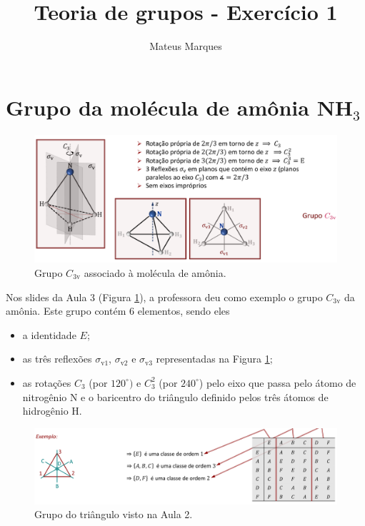 \documentclass[a4paper,10pt]{article}
\title{\Huge{\textbf{Teoria de grupos - Exercício 1}}}
\author{Mateus Marques}
\begin{document}
\maketitle

\section*{Grupo da molécula de amônia NH$_3$}

\begin{figure}[H]
\centering
\includegraphics[width=\linewidth]{fig/C3v.png}
\caption{Grupo $C_{3\text{v}}$ associado à molécula de amônia.}
\label{fig:C3v}
\end{figure}

Nos slides da Aula 3 (Figura \ref{fig:C3v}), a professora deu como exemplo o grupo $C_{3\text{v}}$ da amônia. Este grupo contém 6 elementos, sendo eles
\begin{itemize}
\item a identidade $E$;
 \item as três reflexões $\sigma_{\text{v}1}$, $\sigma_{\text{v}2}$ e $\sigma_{\text{v}3}$ representadas na Figura \ref{fig:C3v};
\item as rotações $C_3$ (por $120^\circ)$ e $C_3^2$ (por $240^\circ$) pelo eixo que passa pelo átomo de nitrogênio N e o baricentro do triângulo definido pelos três átomos de hidrogênio H.
\end{itemize}

\begin{figure}[H]
\centering
\includegraphics[width=\linewidth]{fig/triangulo.png}
\caption{Grupo do triângulo visto na Aula 2.}
\label{fig:triangulo}
\end{figure}
\end{document}
